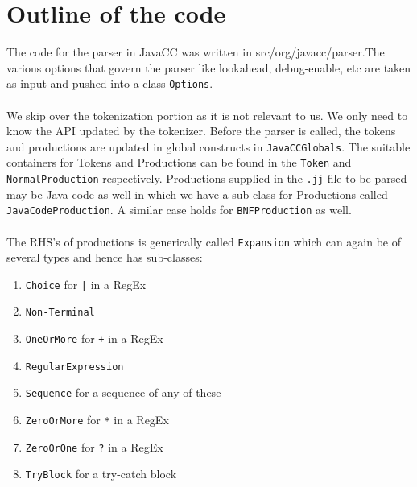 \documentclass[•]{book}
\begin{document}
\section{Outline of the code}
The code for the parser in JavaCC was written in src/org/javacc/parser.The various options that govern the parser like lookahead, debug-enable, etc are taken as input and pushed into a class \texttt{Options}.\\\\We skip over the tokenization portion as it is not relevant to us. We only need to know the API updated by the tokenizer. Before the parser is called, the tokens and productions are updated in global constructs in \texttt{JavaCCGlobals}. The suitable containers for Tokens and Productions can be found in the \texttt{Token} and \texttt{NormalProduction} respectively. Productions supplied in the \texttt{.jj} file to be parsed may be Java code as well in which we have a sub-class for Productions called \texttt{JavaCodeProduction}. A similar case holds for \texttt{BNFProduction} as well.\\\\The RHS's of productions is generically called \texttt{Expansion} which can again be of several types and hence has sub-classes:
\begin{enumerate}
\item \texttt{Choice} for \texttt{|} in a RegEx
\item \texttt{Non-Terminal}
\item \texttt{OneOrMore} for \texttt{+} in a RegEx
\item \texttt{RegularExpression}
\item \texttt{Sequence} for a sequence of any of these
\item \texttt{ZeroOrMore} for \texttt{*} in a RegEx
\item \texttt{ZeroOrOne} for \texttt{?} in a RegEx
\item \texttt{TryBlock} for a try-catch block
\end{enumerate}
\end{document}
